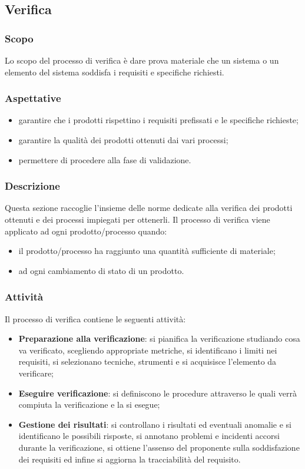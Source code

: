	
	\subsection{Verifica}
	\subsubsection{Scopo}
	Lo scopo del processo di verifica è dare prova materiale che un sistema o un elemento del sistema soddisfa i requisiti e specifiche richiesti.
	
	\subsubsection{Aspettative}
	\begin{itemize}
		\item garantire che i prodotti rispettino i requisiti prefissati e le specifiche richieste;
		\item garantire la qualità dei prodotti ottenuti dai vari processi;
		\item permettere di procedere alla fase di validazione.
	\end{itemize}

	\subsubsection{Descrizione}
	Questa sezione raccoglie l'insieme delle norme dedicate alla verifica dei prodotti ottenuti e dei processi impiegati per ottenerli. Il processo di verifica viene applicato ad ogni prodotto/processo quando:
	\begin{itemize}
		\item il prodotto/processo ha raggiunto una quantità sufficiente di materiale;
		\item ad ogni cambiamento di stato di un prodotto.
	\end{itemize}
	
	 
	\subsubsection{Attività}
	Il processo di verifica contiene le seguenti attività:
	\begin{itemize}
	    \item \textbf{Preparazione alla verificazione}: si pianifica la verificazione studiando cosa va verificato, scegliendo appropriate metriche, si identificano i limiti nei requisiti, si selezionano tecniche, strumenti e si acquisisce l'elemento da verificare;
	    \item \textbf{Eseguire verificazione}: si definiscono le procedure attraverso le quali verrà compiuta la verificazione e la si esegue;
	    \item \textbf{Gestione dei risultati}: si controllano i risultati ed eventuali anomalie e si identificano le possibili risposte, si annotano problemi e incidenti accorsi durante la verificazione, si ottiene l'assenso del proponente sulla soddisfazione dei requisiti ed infine si aggiorna la tracciabilità del requisito.
	\end{itemize}
